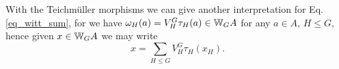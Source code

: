 %
%
\begin{rem}\label{rem_teichmueller_sum}
With the Teichm\"uller morphisms we can give another interpretation for Eq. \ref{eq_witt_sum}, for we have $\omega_H (a) = V^G_H \tau_H (a) \in \mathbb{W}_G A$ for any $a \in A$, $H \leq G$, hence given $x \in \mathbb{W}_G A$ we may write
\begin{equation}\label{eq_witt_teichmueller_sum}
	x = \sum_{H \leq G} V_H^G \tau_H (x_H).
\end{equation}
\end{rem}
